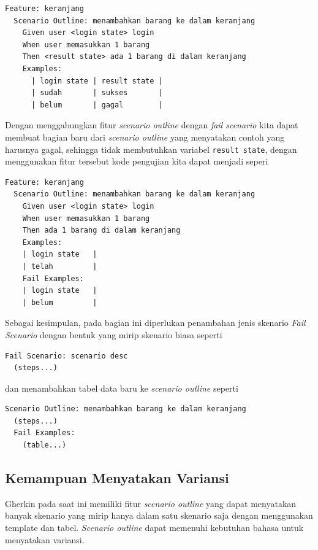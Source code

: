 \begin{lstlisting}[language=gherkin]
Feature: keranjang
  Scenario Outline: menambahkan barang ke dalam keranjang
    Given user <login state> login
    When user memasukkan 1 barang
    Then <result state> ada 1 barang di dalam keranjang
    Examples:
      | login state | result state |
      | sudah       | sukses       |
      | belum       | gagal        |
\end{lstlisting}

Dengan menggabungkan fitur \emph{scenario outline} dengan \emph{fail scenario}
kita dapat membuat bagian baru dari \emph{scenario outline} yang menyatakan contoh
yang harusnya gagal, sehingga tidak membutuhkan variabel \texttt{result state},
dengan menggunakan fitur tersebut kode pengujian kita dapat menjadi seperi

\begin{lstlisting}[language=gherkin]
Feature: keranjang
  Scenario Outline: menambahkan barang ke dalam keranjang
    Given user <login state> login
    When user memasukkan 1 barang
    Then ada 1 barang di dalam keranjang
    Examples:
    | login state   |
    | telah         |
    Fail Examples:
    | login state   |
    | belum         |
\end{lstlisting}

Sebagai kesimpulan, pada bagian ini diperlukan penambahan jenis skenario \emph{Fail Scenario}
dengan bentuk yang mirip skenario biasa seperti

\begin{lstlisting}[language=gherkin]
Fail Scenario: scenario desc
  (steps...)
\end{lstlisting}

dan menambahkan tabel data baru ke \emph{scenario outline} seperti

\begin{lstlisting}[language=gherkin]
Scenario Outline: menambahkan barang ke dalam keranjang
  (steps...)
  Fail Examples:
    (table...)
\end{lstlisting}



\subsection{Kemampuan Menyatakan Variansi}

Gherkin pada saat ini memiliki fitur \emph{scenario outline} yang dapat menyatakan banyak skenario yang mirip
hanya dalam satu skenario saja dengan menggunakan template dan tabel.
\emph{Scenario outline} dapat memenuhi kebutuhan bahasa untuk menyatakan variansi.

